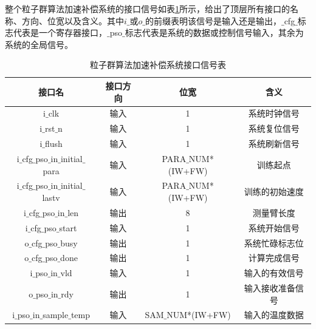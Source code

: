 整个粒子群算法加速补偿系统的接口信号如表\ref{tab:粒子群算法加速补偿系统接口信号表}所示，给出了顶层所有接口的名称、方向、位宽以及含义。其中$i\_$或$o\_$的前缀表明该信号是输入还是输出，$\_$cfg$\_$标志代表是一个寄存器接口，$\_$pso$\_$标志代表是系统的数据或控制信号输入，其余为系统的全局信号。
\begin{table}[H]
    \centering
    \caption{粒子群算法加速补偿系统接口信号表}
    \label{tab:粒子群算法加速补偿系统接口信号表}
    \begin{tabular}{c|c|c|c}
        \hline
        接口名                                       & 接口方向  & 位宽               &含义                         \\ \hline
        i$\_$clk                                    & 输入      & 1                     & 系统时钟信号              \\ \hline
        i$\_$rst$\_$n                               & 输入      & 1                     & 系统复位信号   \\ \hline
        i$\_$flush                                  & 输入      & 1                     & 系统刷新信号              \\ \hline
        i$\_$cfg$\_$pso$\_$in$\_$initial$\_$para    & 输入      & PARA$\_$NUM*(IW+FW)   & 训练起点                 \\ \hline
        i$\_$cfg$\_$pso$\_$in$\_$initial$\_$lastv   & 输入      & PARA$\_$NUM*(IW+FW)   & 训练的初始速度            \\ \hline
        i$\_$cfg$\_$pso$\_$in$\_$len                & 输出      & 8                     & 测量臂长度                \\ \hline
        i$\_$cfg$\_$pso$\_$start                    & 输入      & 1                     & 系统开始信号              \\ \hline
        o$\_$cfg$\_$pso$\_$busy                     & 输出      & 1                     & 系统忙碌标志位            \\ \hline
        o$\_$cfg$\_$pso$\_$done                     & 输出      & 1                     & 计算完成信号              \\ \hline
        i$\_$pso$\_$in$\_$vld                       & 输入      & 1                     & 输入的有效信号            \\ \hline
        o$\_$pso$\_$in$\_$rdy                       & 输出      & 1                     & 输入接收准备信号          \\ \hline
        i$\_$pso$\_$in$\_$sample$\_$temp            & 输入      & SAM$\_$NUM*(IW+FW)    & 输入的温度数据            \\ \hline

\end{tabular}
\end{table}
